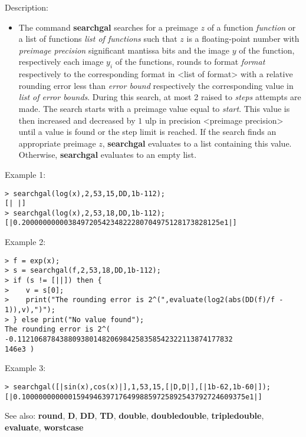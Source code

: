 \noindent Description: \begin{itemize}

\item The command \textbf{searchgal} searches for a preimage $z$ of a function
   \emph{function} or a list of functions \emph{list of functions} such that
   $z$ is a floating-point number with \emph{preimage precision}
   significant mantissa bits and the image $y$ of the function,
   respectively each image $y_i$ of the functions, rounds to
   format \emph{format} respectively to the corresponding format in <list of
   format> with a relative rounding error less than \emph{error bound}
   respectively the corresponding value in \emph{list of error bounds}. During
   this search, at most 2 raised to \emph{steps} attempts are made. The search
   starts with a preimage value equal to \emph{start}. This value is then
   increased and decreased by $1$ ulp in precision <preimage
   precision> until a value is found or the step limit is reached.
   If the search finds an appropriate preimage $z$, \textbf{searchgal}
   evaluates to a list containing this value. Otherwise, \textbf{searchgal}
   evaluates to an empty list.
\end{itemize}
\noindent Example 1: 
\begin{center}\begin{minipage}{15cm}\begin{Verbatim}[frame=single]
> searchgal(log(x),2,53,15,DD,1b-112);
[| |]
> searchgal(log(x),2,53,18,DD,1b-112);
[|0.20000000000384972054234822280704975128173828125e1|]
\end{Verbatim}
\end{minipage}\end{center}
\noindent Example 2: 
\begin{center}\begin{minipage}{15cm}\begin{Verbatim}[frame=single]
> f = exp(x);
> s = searchgal(f,2,53,18,DD,1b-112);
> if (s != [||]) then {
>    v = s[0];
>    print("The rounding error is 2^(",evaluate(log2(abs(DD(f)/f - 1)),v),")");
> } else print("No value found");
The rounding error is 2^( -0.112106878438809380148206984258358542322113874177832
146e3 )
\end{Verbatim}
\end{minipage}\end{center}
\noindent Example 3: 
\begin{center}\begin{minipage}{15cm}\begin{Verbatim}[frame=single]
> searchgal([|sin(x),cos(x)|],1,53,15,[|D,D|],[|1b-62,1b-60|]);
[|0.10000000000015949463971764998859725892543792724609375e1|]
\end{Verbatim}
\end{minipage}\end{center}
See also: \textbf{round}, \textbf{D}, \textbf{DD}, \textbf{TD}, \textbf{double}, \textbf{doubledouble}, \textbf{tripledouble}, \textbf{evaluate}, \textbf{worstcase}
